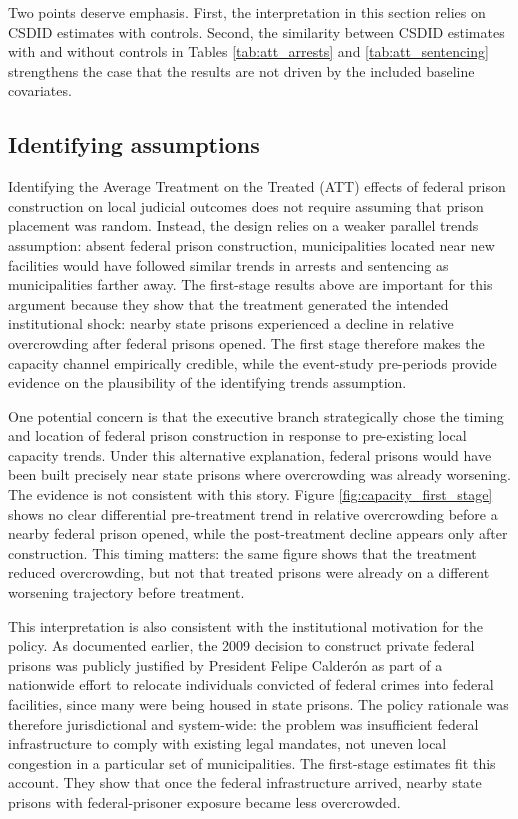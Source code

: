 

Two points deserve emphasis. First, the interpretation in this section relies on CSDID estimates with controls. Second, the similarity between CSDID estimates with and without controls in Tables \ref{tab:att_arrests} and \ref{tab:att_sentencing} strengthens the case that the results are not driven by the included baseline covariates.

\subsection*{Identifying assumptions}

Identifying the Average Treatment on the Treated (ATT) effects of federal prison construction on local judicial outcomes does not require assuming that prison placement was random. Instead, the design relies on a weaker parallel trends assumption: absent federal prison construction, municipalities located near new facilities would have followed similar trends in arrests and sentencing as municipalities farther away. The first-stage results above are important for this argument because they show that the treatment generated the intended institutional shock: nearby state prisons experienced a decline in relative overcrowding after federal prisons opened. The first stage therefore makes the capacity channel empirically credible, while the event-study pre-periods provide evidence on the plausibility of the identifying trends assumption.

One potential concern is that the executive branch strategically chose the timing and location of federal prison construction in response to pre-existing local capacity trends. Under this alternative explanation, federal prisons would have been built precisely near state prisons where overcrowding was already worsening. The evidence is not consistent with this story. Figure \ref{fig:capacity_first_stage} shows no clear differential pre-treatment trend in relative overcrowding before a nearby federal prison opened, while the post-treatment decline appears only after construction. This timing matters: the same figure shows that the treatment reduced overcrowding, but not that treated prisons were already on a different worsening trajectory before treatment.

This interpretation is also consistent with the institutional motivation for the policy. As documented earlier, the 2009 decision to construct private federal prisons was publicly justified by President Felipe Calderón as part of a nationwide effort to relocate individuals convicted of federal crimes into federal facilities, since many were being housed in state prisons. The policy rationale was therefore jurisdictional and system-wide: the problem was insufficient federal infrastructure to comply with existing legal mandates, not uneven local congestion in a particular set of municipalities. The first-stage estimates fit this account. They show that once the federal infrastructure arrived, nearby state prisons with federal-prisoner exposure became less overcrowded.

